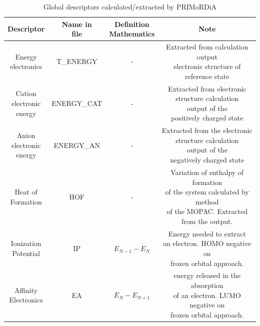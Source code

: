 \documentclass[a4paper,11pt]{refart}
\begin{document}
\hspace*{-\leftmarginwidth}
\begin{minipage}{\fullwidth}
	\begin{table}[H]
		\centering
		\caption{Global descriptors calculated/extracted by PRIMoRDiA}
		\begin{tabular}{c|c|c|c}
			\toprule
			Descriptor &\makecell{Name in\\file}&\makecell{Definition\\Mathematics}&Note \\
			\midrule
			\makecell{Energy \\electronics} & T\_ENERGY&-&\makecell{Extracted from calculation output\\ electronic structure of \\reference state}\\\hline
			\makecell{Cation \\electronic\\energy} &ENERGY\_CAT &-& \makecell{Extracted from electronic structure calculation\\ output of the \\positively charged state}\\\hline
			\makecell{Anion \\electronic\\energy} &ENERGY\_AN &-&\makecell{Extracted from the electronic structure calculation\\ output of the \\negatively charged state}\\\hline
			\makecell{Heat of\\Formation} & HOF&-&\makecell{Variation of enthalpy of formation\\ of the system calculated by method\\ of the MOPAC. Extracted from the output.} \\\hline
			\makecell{Ionization \\Potential} & IP & $E_{N-1}-E_{N}$ & \makecell{Energy needed to extract \\an electron. HOMO negative on \\frozen orbital approach.} \\ \hline
			\makecell{Affinity \\Electronics}& EA & $E_{N}-E_{N+1}$ & \makecell{energy released in the absorption \\of an electron. LUMO negative on \\frozen orbital approach.} \\ \hline

\end{tabular}
\end{table}
\end{minipage}
\end{document}
